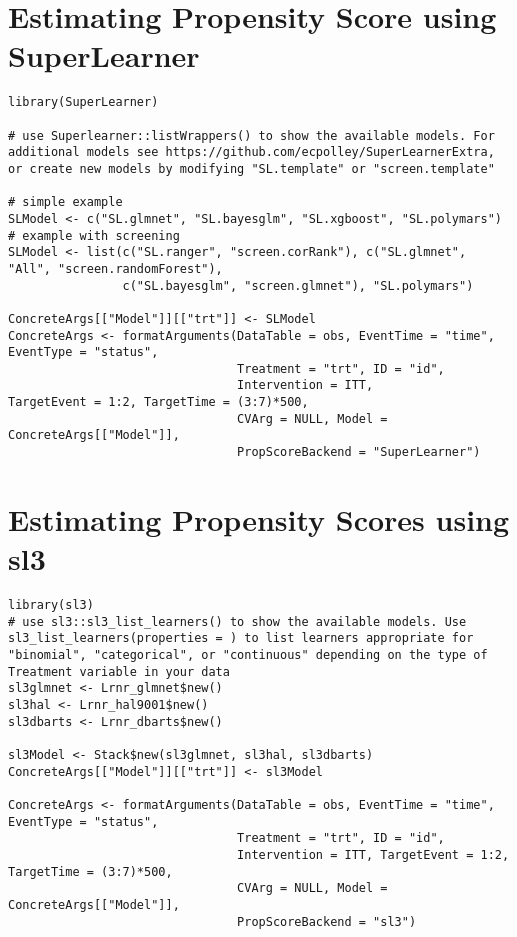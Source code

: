 \documentclass{report}
\newcommand{\1}{\ensuremath{\mathbf{1}}}
\begin{document}
\section{Estimating Propensity Score using SuperLearner}


\begin{lstlisting}
library(SuperLearner)

# use Superlearner::listWrappers() to show the available models. For additional models see https://github.com/ecpolley/SuperLearnerExtra, or create new models by modifying "SL.template" or "screen.template"

# simple example
SLModel <- c("SL.glmnet", "SL.bayesglm", "SL.xgboost", "SL.polymars")
# example with screening
SLModel <- list(c("SL.ranger", "screen.corRank"), c("SL.glmnet", "All", "screen.randomForest"), 
                c("SL.bayesglm", "screen.glmnet"), "SL.polymars")

ConcreteArgs[["Model"]][["trt"]] <- SLModel
ConcreteArgs <- formatArguments(DataTable = obs, EventTime = "time", EventType = "status", 
                                Treatment = "trt", ID = "id", 
                                Intervention = ITT,
TargetEvent = 1:2, TargetTime = (3:7)*500, 
                                CVArg = NULL, Model = ConcreteArgs[["Model"]], 
                                PropScoreBackend = "SuperLearner")
\end{lstlisting}

\section{Estimating Propensity Scores using sl3}

\begin{lstlisting}
library(sl3)
# use sl3::sl3_list_learners() to show the available models. Use sl3_list_learners(properties = ) to list learners appropriate for "binomial", "categorical", or "continuous" depending on the type of Treatment variable in your data
sl3glmnet <- Lrnr_glmnet$new()
sl3hal <- Lrnr_hal9001$new()
sl3dbarts <- Lrnr_dbarts$new()

sl3Model <- Stack$new(sl3glmnet, sl3hal, sl3dbarts)
ConcreteArgs[["Model"]][["trt"]] <- sl3Model

ConcreteArgs <- formatArguments(DataTable = obs, EventTime = "time", EventType = "status", 
                                Treatment = "trt", ID = "id", 
                                Intervention = ITT, TargetEvent = 1:2, TargetTime = (3:7)*500, 
                                CVArg = NULL, Model = ConcreteArgs[["Model"]], 
                                PropScoreBackend = "sl3")
\end{lstlisting}
\end{document}
